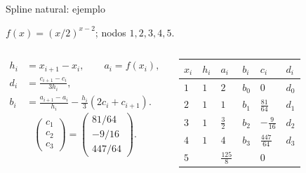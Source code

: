 \documentclass[main.tex]{subfiles}
\begin{document}
\begin{frame}[t]{Spline natural: ejemplo}
\par\noindent\begin{minipage}[t][9mm][t]{\textwidth}\small\strut $f(x)=(x/2)^{x-2}$; nodos $1,2,3,4,5$.\end{minipage}\par\nointerlineskip
\begin{columns}[T]\scriptsize\begin{align*}
h_i&=x_{i+1}-x_i,\qquad a_i=f(x_i),\\
d_i&=\frac{c_{i+1}-c_i}{3h_i},\\
b_i&=\frac{a_{i+1}-a_i}{h_i}-\frac{h_i}{3}(2c_i+c_{i+1}).
\end{align*}\scriptsize\[\begin{pmatrix}c_1\\c_2\\c_3\end{pmatrix}=\begin{pmatrix}81/64\\-9/16\\447/64\end{pmatrix}.\]\begin{minipage}[t]{\textwidth}\begingroup\scriptsize\setlength{\tabcolsep}{2pt}\begin{center}\begin{tabular}{|C{.12\textwidth}|C{.12\textwidth}|C{.12\textwidth}|C{.12\textwidth}|C{.12\textwidth}|C{.12\textwidth}|}\hline
\rule[-2mm]{0pt}{6mm}$x_i$&$h_i$&$a_i$&$b_i$&$c_i$&$d_i$\\\hline
\rule[-2.5mm]{0pt}{7mm}$1$&$1$&$2$&$b_0$&$0$&$d_0$\\\hline
\rule[-2.5mm]{0pt}{7mm}$2$&$1$&$1$&$b_1$&$\frac{81}{64}$&$d_1$\\\hline
\rule[-2.5mm]{0pt}{7mm}$3$&$1$&$\frac{3}{2}$&$b_2$&$-\frac{9}{16}$&$d_2$\\\hline
\rule[-2.5mm]{0pt}{7mm}$4$&$1$&$4$&$b_3$&$\frac{447}{64}$&$d_3$\\\hline
\rule[-2.5mm]{0pt}{7mm}$5$&&$\frac{125}{8}$&&$0$&\\\hline
\end{tabular}\end{center}\endgroup\end{minipage}\par
\end{columns}
\end{frame}
\end{document}
